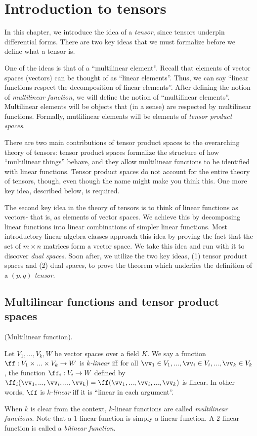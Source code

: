 \chapter{Introduction to tensors}
\label{ch::motivated_intro}

In this chapter, we introduce the idea of a \textit{tensor}, since tensors underpin differential forms. There are two key ideas that we must formalize before we define what a tensor is.

One of the ideas is that of a ``multilinear element''. Recall that elements of vector spaces (vectors) can be thought of as ``linear elements''. Thus, we can say ``linear functions respect the decomposition of linear elements''. After defining the notion of \textit{multilinear function}, we will define the notion of ``multilinear elements''. Multilinear elements will be objects that (in a sense) are respected by multilinear functions. Formally, mutlilinear elements will be elements of \textit{tensor product spaces}. 

There are two main contributions of tensor product spaces to the overarching theory of tensors: tensor product spaces formalize the structure of how ``multilinear things'' behave, and they allow multilinear functions to be identified with linear functions. Tensor product spaces do not account for the entire theory of tensors, though, even though the name might make you think this. One more key idea, described below, is required.

The second key idea in the theory of tensors is to think of linear functions as vectors- that is, as elements of vector spaces. We achieve this by decomposing linear functions into linear combinations of simpler linear functions. Most introductory linear algebra classes approach this idea by proving the fact that the set of $m \times n$ matrices form a vector space. We take this idea and run with it to discover \textit{dual spaces}. Soon after, we utilize the two key ideas, (1) tensor product spaces and (2) dual spaces, to prove the theorem which underlies the definition of a \textit{$(p, q)$ tensor}.

\section{Multilinear functions and tensor product spaces}

\begin{defn}
    (Multilinear function).
    
    Let $V_1, ..., V_k, W$ be vector spaces over a field $K$. We say a function $\ff:V_1 \times ... \times V_k \rightarrow W$ is \textit{$k$-linear} iff for all $\vv_1 \in V_1, ..., \vv_i \in V_i, ..., \vv_k \in V_k$, the function $\ff_i:V_i \rightarrow W$ defined by $\ff_i(\vv_1, ..., \vv_i, ..., \vv_k) = \ff(\vv_1, ..., \vv_i, ..., \vv_k)$ is linear. In other words, $\ff$ is \textit{$k$-linear} iff it is ``linear in each argument''. 
    
    When $k$ is clear from the context, $k$-linear functions are called \textit{multilinear functions}. Note that a $1$-linear function is simply a linear function. A $2$-linear function is called a \textit{bilinear function}.
\end{defn}

